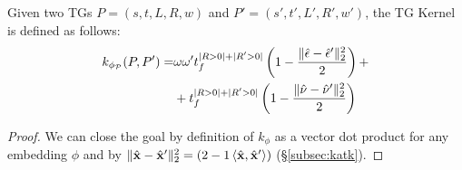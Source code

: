 \begin{proposition}\label{lem:rewritinglemma}
Given two TGs $P=(s,t,L,R,w)$ and $P'=(s',t',L',R',w')$, the TG Kernel is defined as follows:
$$\begin{aligned}
k_{\phi_{\mathcal{P}}}(P,P')=&\omega\omega't_f^{|R>0|+|R'>0|}\left(1-\frac{\|\hat{\epsilon}-\hat{\epsilon}'\|_{2}^2}{2}\right)+\\
	&+t_f^{|R>0|+|R'>0|}\left(1-\frac{\|\hat{\nu}-\hat{\nu}'\|_{2}^2}{2}\right)\\
\end{aligned}$$
\end{proposition}
\begin{proof} We can close the goal by definition of $k_{\phi}$ as a vector dot product for any embedding $\phi$ and by  $\|\hat{\mathbf{x}}-\hat{\mathbf{x}}'\|_2^2=(2-1\braket{\hat{\mathbf{x}},\hat{\mathbf{x}}'})$ (\S\ref{subsec:katk}).	
%	
\end{proof}

